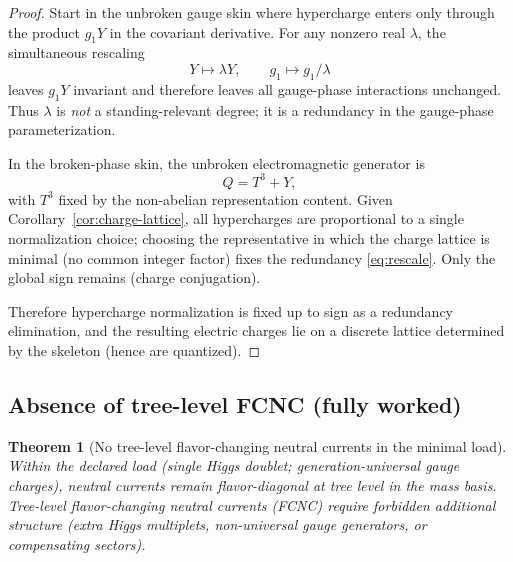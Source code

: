\documentclass[11pt]{article}
\newtheorem{theorem}[definition]{Theorem}
\theoremstyle{remark}
\begin{document}
\begin{proof}
Start in the unbroken gauge skin where hypercharge enters only through the product $g_1 Y$ in the
covariant derivative. For any nonzero real $\lambda$, the simultaneous rescaling
\begin{equation}\label{eq:rescale}
Y\mapsto \lambda Y,\qquad g_1\mapsto g_1/\lambda
\end{equation}
leaves $g_1 Y$ invariant and therefore leaves all gauge-phase interactions unchanged. Thus $\lambda$ is
\emph{not} a standing-relevant degree; it is a redundancy in the gauge-phase parameterization.

In the broken-phase skin, the unbroken electromagnetic generator is
\begin{equation}\label{eq:Q}
Q=T^3+Y,
\end{equation}
with $T^3$ fixed by the non-abelian representation content. Given Corollary~\ref{cor:charge-lattice},
all hypercharges are proportional to a single normalization choice; choosing the representative in which
the charge lattice is minimal (no common integer factor) fixes the redundancy \eqref{eq:rescale}.
Only the global sign remains (charge conjugation).

Therefore hypercharge normalization is fixed up to sign as a redundancy elimination, and the resulting
electric charges lie on a discrete lattice determined by the skeleton (hence are quantized).
\end{proof}

\subsection{Absence of tree-level FCNC (fully worked)}

\begin{theorem}[No tree-level flavor-changing neutral currents in the minimal load]\label{thm:fcnc}
Within the declared load (single Higgs doublet; generation-universal gauge charges), neutral currents
remain flavor-diagonal at tree level in the mass basis. Tree-level flavor-changing neutral currents
(FCNC) require forbidden additional structure (extra Higgs multiplets, non-universal gauge generators,
or compensating sectors).
\end{theorem}
\end{document}
